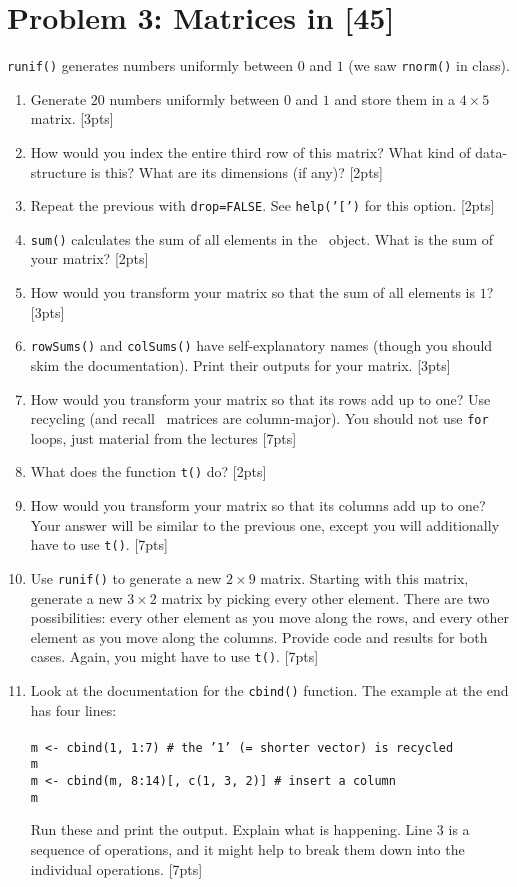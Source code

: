 \documentclass[10pt]{article}
\begin{document}
\section{Problem 3: Matrices in \R\hfill  [45]} 
  {\tt runif()} generates numbers uniformly between $0$ and $1$ (we saw {\tt rnorm()} in class).
\begin{enumerate}
  \item Generate $20$ numbers uniformly between $0$ and $1$ and store them in a $4 \times 5$ matrix. \hfill[3pts]
  \item How would you index the entire third row of this matrix? What kind of data-structure is this? 
    What are its dimensions (if any)? \hfill[2pts]
  \item Repeat the previous with {\tt drop=FALSE}. See {\tt help('[')} for this option. \hfill[2pts]
  \item {\tt sum()} calculates the sum of all elements in the \R\ object. What is the sum of your matrix? \hfill[2pts]
  \item How would you transform your matrix so that the sum of all elements is $1$? \hfill[3pts]
  \item {\tt rowSums()} and {\tt colSums()} have self-explanatory names (though you should skim the documentation).
    Print their outputs for your matrix. \hfill[3pts]
  \item How would you transform your matrix so that its rows add up to one? Use recycling (and recall \R\ matrices are column-major). 
    You should not use {\tt for} loops, just material from the lectures \hfill[7pts]
  \item What does the function {\tt t()} do? \hfill[2pts]
  \item How would you transform your matrix so that its columns add up to one? Your answer will be similar to the previous
    one, except you will additionally have to use {\tt t()}. \hfill[7pts]
  \item Use {\tt runif()} to generate a new $2 \times 9$ matrix. Starting with this matrix, generate a new $3 \times 2$ matrix
    by picking every other element. There are two possibilities: every other element as you move along the rows, and every other
    element as you move along the columns. Provide code and results for both cases. Again, you might have to use {\tt t()}. \hfill [7pts]
  \item Look at the documentation for the {\tt cbind()} function. The example at the end has four lines: \\~\\
    {\tt\qquad \qquad m <- cbind(1, 1:7) \# the '1' (= shorter vector) is recycled \\
\qquad  \qquad m \\
  \qquad\qquad m <- cbind(m, 8:14)[, c(1, 3, 2)] \# insert a column \\
  \qquad\qquad m
}

Run these and print the output. Explain what is happening. Line 3 is a sequence of operations, and it might help to break them
down into the individual operations. \hfill[7pts]
\end{enumerate}
\end{document}
